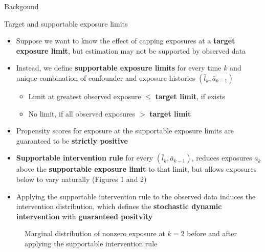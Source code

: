 \documentclass[20pt,final]{beamer}
\newlength{\onecolwid}
\begin{document}
\begin{frame}[t]
\begin{columns}[t,totalwidth=\onecolwid]
\begin{column}{\onecolwid}
{\begin{block}{Backgound}
        \end{block}


        \begin{block}{Target and supportable exposure limits}

          \begin{itemize}
            \item Suppose we want to know the effect of capping exposures at a \textbf{target exposure limit},
                  but estimation may not be supported by observed data
            \item Instead, we define \textbf{supportable exposure limits}
                  for every time $k$ and unique combination of confounder and exposure histories
                  $(\bar l_{k}, \bar a_{k - 1})$
                  \begin{itemize}
                    \item Limit at greatest observed exposure $\le$ \textbf{target limit}, if exists
                    \item No limit, if all observed exposures $>$ \textbf{target limit}
                  \end{itemize}
            \item Propensity scores for exposure at the supportable exposure limits
                  are guaranteed to be \textbf{strictly positive}
            \item \textbf{Supportable intervention rule} for every
                  $(\bar l_{k}, \bar a_{k - 1})$, reduces exposures $a_k$ above the
                  \textbf{supportable exposure limit} to that limit, but allows exposures
                  below to vary naturally (Figures 1 and 2)
            \item Applying the supportable intervention rule to the observed data
                  induces the intervention distribution, which defines the
                  \textbf{stochastic dynamic intervention} with \textbf{guaranteed positvity}
          \end{itemize}

          \vspace{0.1\baselineskip}
          \begin{figure}
            \caption{Marginal distribution of nonzero exposure at $k = 2$
              before and after applying the supportable intervention rule}
            \begin{tikzpicture}[x=2.5pt,y=2.5pt]
              
            \end{tikzpicture}
          \end{figure}


\end{block}}
\end{column}
\end{columns}
\end{frame}
\end{document}

